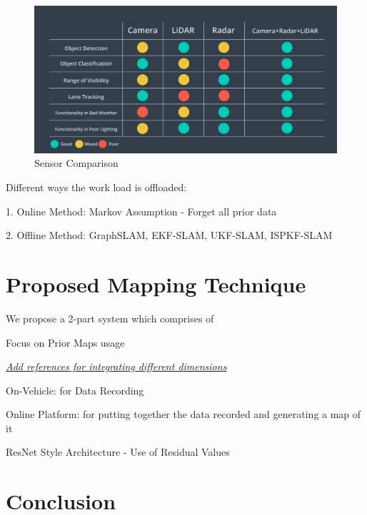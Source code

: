 \documentclass{article}
\begin{document}
	\begin{figure}
		\includegraphics[width=\textwidth]{Sensor_Comparison}
		\caption{Sensor Comparison
		\cite{noauthor_self-driving_nodate}}
	\end{figure}

	
	
	
	Different ways the work load is offloaded:
	
	1. Online Method: Markov Assumption - Forget all prior data
	
	2. Offline Method: GraphSLAM, EKF-SLAM, UKF-SLAM, ISPKF-SLAM
	
	\section{Proposed Mapping Technique}
	
	We propose a 2-part system which comprises of
	
	Focus on Prior Maps usage
	
	\underline{\textit{Add references for integrating different dimensions}}
	
	On-Vehicle: for Data Recording
	
	Online Platform: for putting together the data recorded and generating a map of it
	
	ResNet Style Architecture - Use of Residual Values 
	
	\section{Conclusion}
	
	
	


\end{document}
